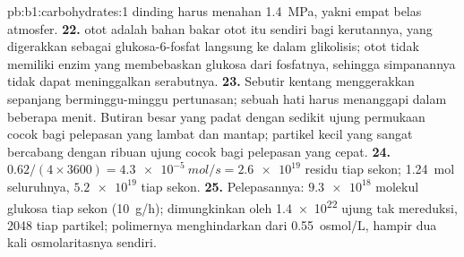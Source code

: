 \begin{solution}{pb:b1:carbohydrates:1}
dinding harus menahan \qty{1.4}{MPa}, yakni empat belas atmosfer.
\textbf{22.}  otot adalah bahan bakar otot itu sendiri bagi
kerutannya, yang digerakkan sebagai glukosa-6-fosfat langsung ke dalam
glikolisis; otot tidak memiliki enzim yang membebaskan glukosa dari
fosfatnya, sehingga simpanannya tidak dapat meninggalkan serabutnya.
\textbf{23.} Sebutir kentang menggerakkan  sepanjang
berminggu-minggu pertunasan; sebuah hati harus menanggapi dalam
beberapa menit. Butiran besar yang padat dengan sedikit ujung permukaan
cocok bagi pelepasan yang lambat dan mantap; partikel kecil yang sangat
bercabang dengan ribuan ujung cocok bagi pelepasan yang cepat.
\textbf{24.} $0.62/(4\times 3600) = \qty{4.3e-5}{mol/s} = \num{2.6e19}$
residu tiap sekon; \qty{1.24}{mol}  seluruhnya, $\num{5.2e19}$ tiap
sekon.
\textbf{25.} Pelepasannya: $\num{9.3e18}$ molekul glukosa tiap sekon
(\qty{10}{g/h}); dimungkinkan oleh \num{1.4e22} ujung tak mereduksi,
\num{2048} tiap partikel; polimernya menghindarkan  dari
\qty{0.55}{osmol/L}, hampir dua kali osmolaritasnya sendiri.
\end{solution}
